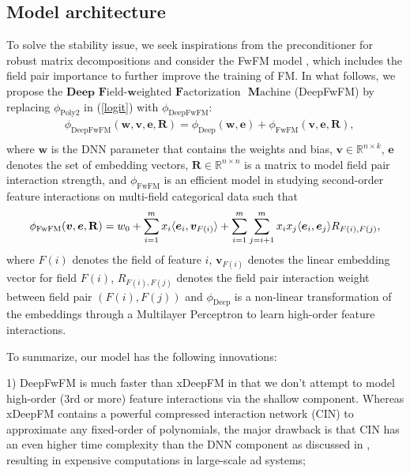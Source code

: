 \documentclass[sigconf]{acmart}
\begin{document}
\subsection{Model architecture}

To solve the stability issue, we seek inspirations from the preconditioner for robust matrix decompositions and consider the FwFM model \citep{fwfm}, which includes the field pair importance to further improve the training of FM. In what follows, we propose the $\textbf{Deep}$ $\textbf{F}\text{ield-}$$\textbf{w}\text{eighted}$ $\textbf{F}\text{actorization }$ $\textbf{M}\text{achine}$ (DeepFwFM) by replacing $\phi_{\text{Poly2}}$ in (\ref{logit}) with $\phi_{\text{DeepFwFM}}$:
\begin{equation}
\begin{split}
    \label{deepfwfm_math}
        &\phi_{\text{DeepFwFM}}(\bm{w}, \bm{v}, \bm{e}, \mathbf{R})=\phi_{\text{Deep}}(\bm{w}, \bm{e}) + \phi_{\text{FwFM}}(\bm{v}, \bm{e}, \mathbf{R}),\\
\end{split}
\end{equation}
where $\bm{w}$ is the DNN parameter that contains the weights and bias, $\bm{v}\in \mathbb{R}^{n\times k}$, $\bm{e}$ denotes the set of embedding vectors, $\mathbf{R}\in \mathbb{R}^{n\times n}$ is a matrix to model field pair interaction strength, and $\phi_{\text{FwFM}}$ is an efficient model\citep{fwfm} in studying second-order feature interactions on multi-field categorical data such that
\begin{equation}
\label{fwfm__}
\small{
    \phi_{\text{FwFM}}(\bm{v}, \bm{e}, \mathbf{R})=w_0+\sum_{i=1}^m x_i \langle \bm{e}_i, \bm{v}_{F(i)} \rangle+\sum_{i=1}^m\sum_{j=i+1}^m x_i x_j \langle \bm{e}_{i}, \bm{e}_{j}\rangle R_{F(i), F(j)},}
\end{equation}
where $F(i)$ denotes the field of feature $i$, $\bm{v}_{F(i)}$ denotes the linear embedding vector for field $F(i)$, $R_{F(i), F(j)}$ denotes the field pair interaction weight between field pair $(F(i),F(j))$ and $\phi_{\text{Deep}}$ is a non-linear transformation of the embeddings through a Multilayer Perceptron to learn high-order feature interactions.

To summarize, our model has the following innovations:
 

1) DeepFwFM is much faster than xDeepFM in that we don't attempt to model high-order (3rd or more) feature interactions via the shallow component. Whereas xDeepFM contains a powerful compressed interaction network (CIN) to approximate any fixed-order of polynomials, the major drawback is that CIN has an even higher time complexity than the DNN component as discussed in \cite{xdeepfm}, resulting in expensive computations in large-scale ad systems;
\end{document}
